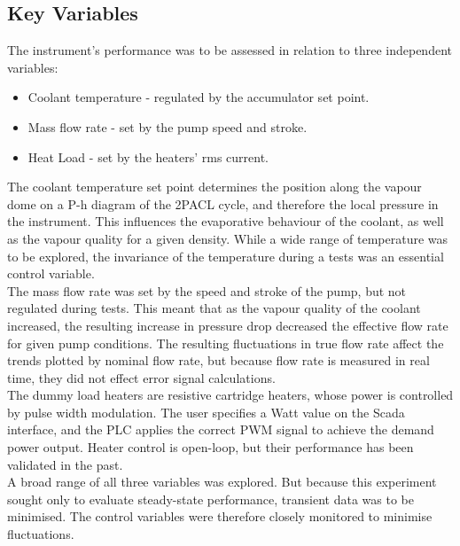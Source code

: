 \documentclass{report}
\begin{document}
\subsection{Key Variables}
The instrument's performance was to be assessed in relation to three independent variables:
\begin{itemize}
\item{Coolant temperature - regulated by the accumulator set point.}
\item{Mass flow rate - set by the pump speed and stroke.} 
\item{Heat Load - set by the heaters' rms current.}
\end{itemize}
The coolant temperature set point determines the position along the vapour dome on a P-h diagram of the 2PACL cycle, and therefore the local pressure in the instrument. This influences the evaporative behaviour of the coolant, as well as the vapour quality for a given density. While a wide range of temperature was to be explored, the invariance of the temperature during a tests was an essential control variable. \\
The mass flow rate was set by the speed and stroke of the pump, but not regulated during tests. This meant that as the vapour quality of the coolant increased, the resulting increase in pressure drop decreased the effective flow rate for given pump conditions. The resulting fluctuations in true flow rate affect the trends plotted by nominal flow rate, but because flow rate is measured in real time, they did not effect error signal calculations.\\
The dummy load heaters are resistive cartridge heaters, whose power is controlled by pulse width modulation. The user specifies a Watt value on the Scada interface, and the PLC applies the correct PWM signal to achieve the demand power output. Heater control is open-loop, but their performance has been validated in the past. %
\\
A broad range of all three variables was explored. But because this experiment sought only to evaluate steady-state performance, transient data was to be minimised. The control variables were therefore closely monitored to minimise fluctuations. 
\end{document}

